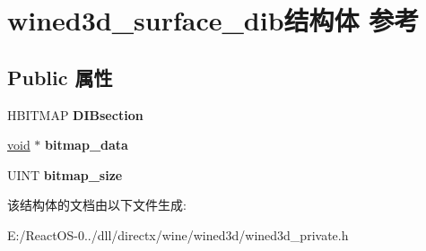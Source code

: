 \hypertarget{structwined3d__surface__dib}{}\section{wined3d\+\_\+surface\+\_\+dib结构体 参考}
\label{structwined3d__surface__dib}
\subsection*{Public 属性}
\begin{DoxyCompactItemize}
\item 
\mbox{\label{structwined3d__surface__dib_aaa433dad880ac64518203e8d084453a2}} 
H\+B\+I\+T\+M\+AP {\bfseries D\+I\+Bsection}
\item 
\mbox{\label{structwined3d__surface__dib_a122fb5bf66e0003783ee851462126a78}} 
\hyperlink{interfacevoid}{void} $\ast$ {\bfseries bitmap\+\_\+data}
\item 
\mbox{\label{structwined3d__surface__dib_a3295a2334307d49780ce5369fca3d8f7}} 
U\+I\+NT {\bfseries bitmap\+\_\+size}
\end{DoxyCompactItemize}


该结构体的文档由以下文件生成\+:\begin{DoxyCompactItemize}
\item 
E\+:/\+React\+O\+S-\/0../dll/directx/wine/wined3d/wined3d\+\_\+private.\+h\end{DoxyCompactItemize}
